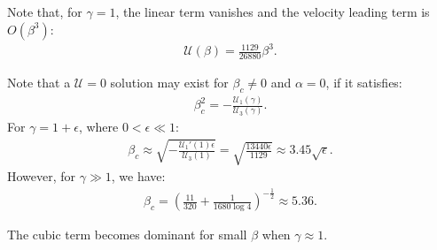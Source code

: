 \documentclass[final]{elsarticle}
\newcommand\eps \epsilon
\newcommand{\pars}[1]{\left(#1\right)}
\newcommand\cU{\mathscr{U}}
\begin{document}
\begin{appendix}
Note that, for $\gamma = 1$, the linear term vanishes and the velocity leading term is $O(\beta^3)$:
\begin{eqnarray*}
\cU(\beta) = \frac{1129}{26880}\beta^3.
\end{eqnarray*}

Note that a $\cU = 0$ solution may exist for $\beta_c \ne 0$ and $\alpha = 0$, 
if it satisfies:
\begin{eqnarray*}
\beta_c^2 = -\frac{\cU_1(\gamma)}{\cU_3(\gamma)}.
\end{eqnarray*}
For $\gamma = 1 + \eps$, where $0 < \eps \ll 1$:
\begin{eqnarray*}
\beta_c \approx \sqrt{-\frac{\cU_1'(1) \eps}{\cU_3(1)}} = 
 \sqrt{\frac{13440 \eps}{1129}} \approx 3.45 \sqrt{\eps}.
\end{eqnarray*}
However, for $\gamma \gg 1$, we have:
\begin{eqnarray*}
\beta_c =  \pars{\frac{11}{320} + \frac{1}{1680 \log 4}}^{-\frac{1}{2}} \approx 5.36.
\end{eqnarray*}

The cubic term becomes dominant for small $\beta$ when $\gamma \approx 1$.

\end{appendix}



\end{document}
